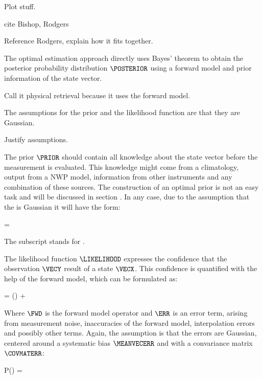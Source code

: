     
    Plot stuff.

    cite Bishop, Rodgers

\stopsection


\startsection[title={Optimal Estimation},reference=ch:optimalestimation]

    Reference Rodgers, explain how it fits together.

    The optimal estimation approach directly uses Bayes' theorem
     to obtain the posterior probability distribution
    $\POSTERIOR$ using a forward model and prior information of the state
    vector.

    Call it physical retrieval because it uses the forward model.

    The assumptions for the prior {\PDF} and the likelihood function
    are that they are Gaussian.

    Justify assumptions.

    The prior $\PRIOR$ should contain all knowledge about the state vector
    before the measurement is evaluated. This knowledge might come from
    a climatology, output from a NWP model, information from other instruments
    and any combination of these sources. The construction of an optimal prior
    is not an easy task and will be discussed in section
    . In any case, due to the assumption that the
    {\PDF} is Gaussian it will have the form:

    \startformula
        \PRIOR = \GAUSS{\VECX}{\MEANVECA}{\COVMATA}
    \stopformula

    The subscript stands for .

    The likelihood function $\LIKELIHOOD$ expresses the confidence that the
    observation $\VECY$ result of a state $\VECX$. This confidence is
    quantified with the help of the forward model, which can be formulated as:

    \startformula
        \VECY = \FWD(\VECX) + \ERR
    \stopformula

    Where $\FWD$ is the forward model operator and $\ERR$ is an error term,
    arising from measurement noise, inaccuracies of the forward model,
    interpolation errors and possibly other terms. Again, the assumption is
    that the errors are Gaussian, centered around a systematic bias
    $\MEANVECERR$ and with a convariance matrix $\COVMATERR$:

    \startformula
        P(\ERR) = \GAUSS{\ERR}{\MEANVECERR}{\COVMATERR}
    \stopformula

